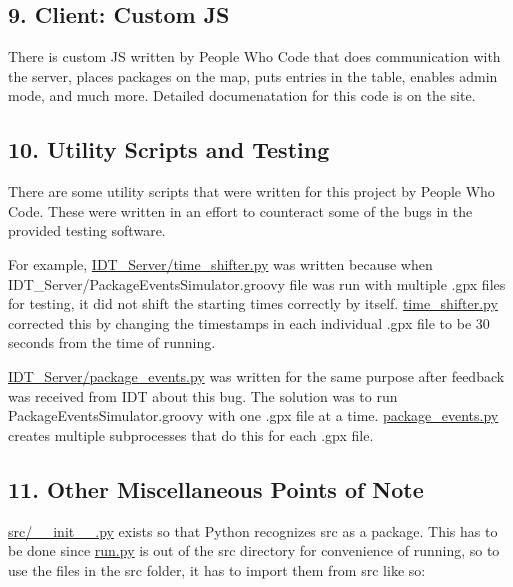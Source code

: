 \subsection*{9. Client\+: Custom JS}

There is custom JS written by People Who Code that does communication with the server, places packages on the map, puts entries in the table, enables admin mode, and much more. Detailed documenatation for this code is on the site.

\subsection*{10. Utility Scripts and Testing}

There are some utility scripts that were written for this project by People Who Code. These were written in an effort to counteract some of the bugs in the provided testing software.

For example, {\ttfamily \hyperlink{time__shifter_8py}{I\+D\+T\+\_\+\+Server/time\+\_\+shifter.\+py}} was written because when {\ttfamily I\+D\+T\+\_\+\+Server/\+Package\+Events\+Simulator.\+groovy} file was run with multiple {\ttfamily .gpx} files for testing, it did not shift the starting times correctly by itself. {\ttfamily \hyperlink{time__shifter_8py}{time\+\_\+shifter.\+py}} corrected this by changing the timestamps in each individual {\ttfamily .gpx} file to be 30 seconds from the time of running.

{\ttfamily \hyperlink{package__events_8py}{I\+D\+T\+\_\+\+Server/package\+\_\+events.\+py}} was written for the same purpose after feedback was received from I\+DT about this bug. The solution was to run {\ttfamily Package\+Events\+Simulator.\+groovy} with one {\ttfamily .gpx} file at a time. {\ttfamily \hyperlink{package__events_8py}{package\+\_\+events.\+py}} creates multiple subprocesses that do this for each {\ttfamily .gpx} file.

\subsection*{11. Other Miscellaneous Points of Note}

{\ttfamily \hyperlink{____init_____8py}{src/\+\_\+\+\_\+init\+\_\+\+\_\+.\+py}} exists so that Python recognizes {\ttfamily src} as a package. This has to be done since {\ttfamily \hyperlink{run_8py}{run.\+py}} is out of the {\ttfamily src} directory for convenience of running, so to use the files in the {\ttfamily src} folder, it has to import them from {\ttfamily src} like so\+:



